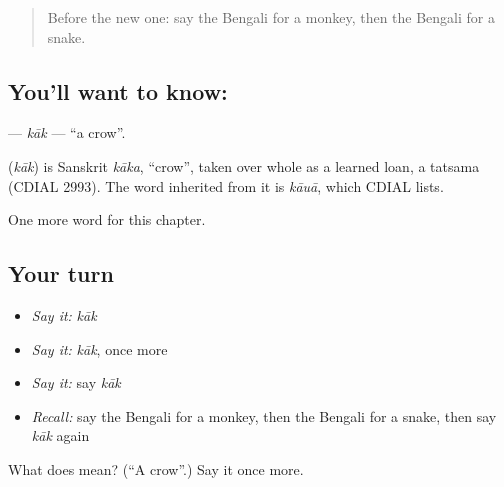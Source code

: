 \begin{quote}
Before the new one: say the Bengali for a monkey, then the Bengali for a snake.
\end{quote}

\subsection*{You'll want to know: }
\textbf{} — \emph{kāk} — \textquotedblleft{}a crow\textquotedblright{}.

\begin{cousinweb}
\textbf{} (\emph{kāk}) is Sanskrit \emph{kāka}, \textquotedblleft{}crow\textquotedblright{}, taken over whole as a learned loan, a tatsama (CDIAL 2993). The word inherited from it is \emph{kāuā}, which CDIAL lists.
\end{cousinweb}

\begin{grammarlens}[title={What you've built}]
One more word for this chapter.
\end{grammarlens}

\subsection*{Your turn}
\begin{itemize}
\raggedright
  \item \emph{Say it:} \emph{kāk}
  \item \emph{Say it:} \emph{kāk}, once more
  \item \emph{Say it:} say \emph{kāk}
  \item \emph{Recall:} say the Bengali for a monkey, then the Bengali for a snake, then say \emph{kāk} again
\end{itemize}

\begin{tcolorbox}[breakable,colback=teal!4,colframe=teal!35!black,title={Before you move on}]
What does  mean? (\textquotedblleft{}A crow\textquotedblright{}.) Say it once more.
\end{tcolorbox}
